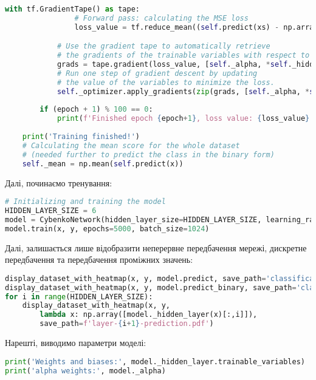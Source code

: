 \begin{lstlisting}[language=Python]
            with tf.GradientTape() as tape:
                # Forward pass: calculating the MSE loss
                loss_value = tf.reduce_mean((self.predict(xs) - np.array([ys]))**2)

            # Use the gradient tape to automatically retrieve
            # the gradients of the trainable variables with respect to the loss.
            grads = tape.gradient(loss_value, [self._alpha, *self._hidden_layer.trainable_variables])
            # Run one step of gradient descent by updating
            # the value of the variables to minimize the loss.
            self._optimizer.apply_gradients(zip(grads, [self._alpha, *self._hidden_layer.trainable_variables]))
        
        if (epoch + 1) % 100 == 0:
            print(f'Finished epoch {epoch+1}, loss value: {loss_value}...')
    
    print('Training finished!')
    # Calculating the mean score for the whole dataset 
    # (needed further to predict the class in the binary form)
    self._mean = np.mean(self.predict(x))
\end{lstlisting}

Далі, починаємо тренування:
\begin{lstlisting}[language=Python]
# Initializing and training the model
HIDDEN_LAYER_SIZE = 6
model = CybenkoNetwork(hidden_layer_size=HIDDEN_LAYER_SIZE, learning_rate=0.05)
model.train(x, y, epochs=5000, batch_size=1024)
\end{lstlisting}

Далі, залишається лише відобразити неперервне передбачення мережі,
дискретне передбачення та передбачення проміжних значень:
\begin{lstlisting}[language=Python]
display_dataset_with_heatmap(x, y, model.predict, save_path='classification-cont-prediction.pdf')
display_dataset_with_heatmap(x, y, model.predict_binary, save_path='classification-discr-prediction.pdf')
for i in range(HIDDEN_LAYER_SIZE):
    display_dataset_with_heatmap(x, y, 
        lambda x: np.array([model._hidden_layer(x)[:,i]]), 
        save_path=f'layer-{i+1}-prediction.pdf')
\end{lstlisting}

Нарешті, виводимо параметри моделі:
\begin{lstlisting}[language=Python]
print('Weights and biases:', model._hidden_layer.trainable_variables)
print('alpha weights:', model._alpha)
\end{lstlisting}
